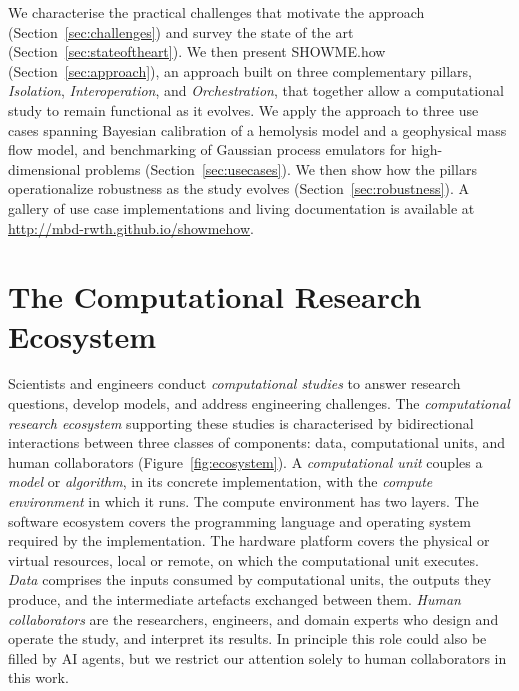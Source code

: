 \documentclass{eceasst}
\begin{document}
We characterise the practical challenges that motivate the approach
(Section~\ref{sec:challenges}) and survey the state of the art (Section~\ref{sec:stateoftheart}).
We then present SHOWME.how (Section~\ref{sec:approach}), an approach built on three
complementary pillars, \emph{Isolation}, \emph{Interoperation}, and
\emph{Orchestration}, that together allow a computational study to remain
functional as it evolves. We apply the approach to three use cases spanning
Bayesian calibration of a hemolysis model and a geophysical mass flow model, and
benchmarking of Gaussian process emulators for high-dimensional problems
(Section~\ref{sec:usecases}). We then show how the pillars operationalize
robustness as the study evolves (Section~\ref{sec:robustness}). A gallery of
use case implementations and living documentation is available at
\url{http://mbd-rwth.github.io/showmehow}.


\section{The Computational Research Ecosystem}
\label{sec:complab}

Scientists and engineers conduct \emph{computational studies} to answer
research questions, develop models, and address engineering challenges.
The \emph{computational research ecosystem} supporting these studies is
characterised by bidirectional interactions between three classes of
components: data, computational units, and human collaborators (Figure~\ref{fig:ecosystem}). 
A \emph{computational unit} couples a
\emph{model} or \emph{algorithm}, in its concrete implementation, with the
\emph{compute environment} in which it runs. The compute environment has two
layers. The software ecosystem covers the programming language and operating
system required by the implementation. The hardware platform covers the
physical or virtual resources, local or remote, on which the computational unit executes. 
\emph{Data} comprises the inputs consumed by computational units, the outputs they 
produce, and the intermediate artefacts exchanged between them. \emph{Human collaborators} 
are the researchers, engineers, and domain experts who design and operate the study, and
interpret its results. In principle this role could also be filled by AI agents, but we
restrict our attention solely to human collaborators in this work.
\end{document}
